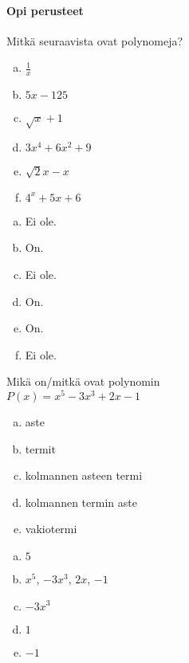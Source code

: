 \begin{tehtavasivu}

\paragraph*{Opi perusteet}

\begin{tehtava}
    Mitkä seuraavista ovat polynomeja?
    \begin{enumerate}[a)]
        \item $\frac{1}{x}$
        \item $5x-125$
        \item $\sqrt{x}+1$
        \item $3x^4+6x^2+9$
        \item $\sqrt{2}x-x$
        \item $4^x+5x+6$
    \end{enumerate}
    \begin{vastaus}
        \begin{enumerate}[a)]
            \item Ei ole.
            \item On.
            \item Ei ole.
            \item On.
            \item On.
            \item Ei ole.
        \end{enumerate}
    \end{vastaus}
\end{tehtava}

\begin{tehtava}
	Mikä on/mitkä ovat polynomin \\ $P(x) = x^5-3x^3+2x-1$
	\begin{enumerate}[a)]
		\item aste
		\item termit
		\item kolmannen asteen termi
		\item kolmannen termin aste
		\item vakiotermi
	\end{enumerate}

	\begin{vastaus}
		\begin{enumerate}[a)]
			\item $5$
			\item $x^5$, $-3x^3$, $2x$, $-1$
			\item $-3x^3$
			\item $1$
			\item $-1$
		\end{enumerate}
	\end{vastaus}
\end{tehtava}



\end{tehtavasivu}
